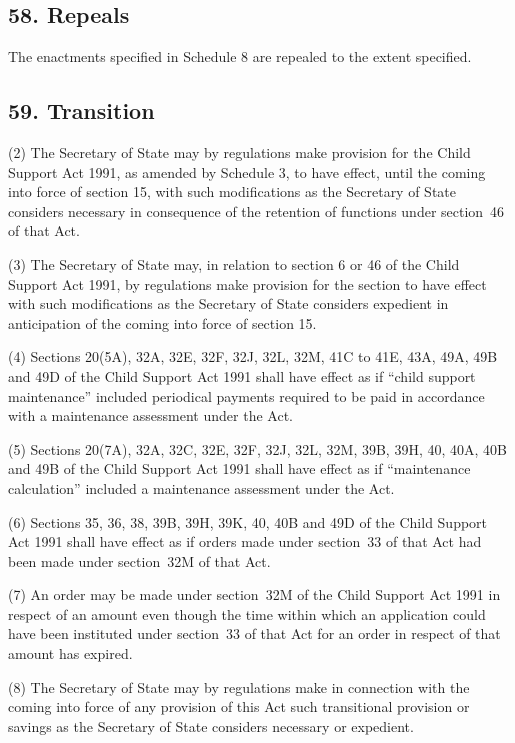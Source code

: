 \documentclass[12pt,a4paper]{article}
\begin{document}
\subsection{58. Repeals}

The enactments specified in Schedule 8 are repealed to the extent specified.

\subsection{59. Transition}


(2) The Secretary of State may by regulations make provision for the Child Support Act 1991, as amended by Schedule 3, to have effect, until the coming into force of section 15, with such modifications as the Secretary of State considers necessary in consequence of the retention of functions under section~46 of that Act.

(3) The Secretary of State may, in relation to section 6 or 46 of the Child Support Act 1991, by regulations make provision for the section to have effect with such modifications as the Secretary of State considers expedient in anticipation of the coming into force of section 15.

(4) Sections 20(5A), 32A, 32E, 32F, 32J, 32L, 32M, 41C to 41E, 43A, 49A, 49B and 49D of the Child Support Act 1991 shall have effect as if “child support maintenance” included periodical payments required to be paid in accordance with a maintenance assessment under the Act.

(5) Sections 20(7A), 32A, 32C, 32E, 32F, 32J, 32L, 32M, 39B, 39H, 40, 40A, 40B and 49B of the Child Support Act 1991 shall have effect as if “maintenance calculation” included a maintenance assessment under the Act.

(6) Sections 35, 36, 38, 39B, 39H, 39K, 40, 40B and 49D of the Child Support Act 1991 shall have effect as if orders made under section~33 of that Act had been made under section~32M of that Act.

(7) An order may be made under section~32M of the Child Support Act 1991 in respect of an amount even though the time within which an application could have been instituted under section~33 of that Act for an order in respect of that amount has expired.

(8) The Secretary of State may by regulations make in connection with the coming into force of any provision of this Act such transitional provision or savings as the Secretary of State considers necessary or expedient.
\end{document}
